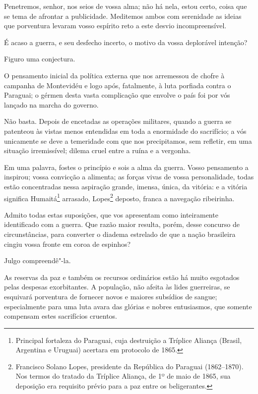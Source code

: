 \begin{linenumbers}

Penetremos, senhor, nos seios de vossa alma; não há nela, estou certo,
coisa que se tema de afrontar a publicidade. Meditemos ambos com		
serenidade as ideias que porventura levaram vosso espírito reto a este
desvio incompreensível. 

É acaso a guerra, e seu desfecho incerto, o motivo da vossa deplorável
intenção? 

Figuro uma conjectura. 

O pensamento inicial da política externa que nos arremessou de chofre à
campanha de Montevidéu e logo após, fatalmente, à luta porfiada contra
o Paraguai; o gérmen desta vasta complicação que envolve o país foi
por vós lançado na marcha do governo. 

Não basta. Depois de encetadas as operações militares, quando a guerra
se patenteou às vistas menos entendidas em toda a enormidade do
sacrifício; a vós unicamente se deve a temeridade com que nos
precipitamos, sem refletir, em uma situação irremissível; dilema cruel
entre a ruína e a vergonha. 

Em uma palavra, fostes o princípio e sois a alma da guerra. Vosso
pensamento a inspirou; vossa convicção a alimenta; as forças vivas de
vossa personalidade, todas estão concentradas nessa aspiração grande,
imensa, única, da vitória: e a vitória significa
Humaitá\footnote{ Principal fortaleza do Paraguai, cuja destruição a Tríplice Aliança
(Brasil, Argentina e Uruguai) acertara em protocolo de 1865.}
 arrasado, Lopes\footnote{ Francisco Solano Lopes, presidente da República do Paraguai
(1862--1870). Nos termos do tratado da Tríplice Aliança, de 1º de maio
de 1865, sua deposição era requisito prévio para a paz entre os
beligerantes.} deposto, franca a navegação ribeirinha. 

Admito todas estas suposições, que vos apresentam como inteiramente
identificado com a guerra. Que razão maior resulta, porém, desse
concurso de circunstâncias, para converter o diadema estrelado de que a
nação brasileira cingiu vossa fronte em coroa de espinhos? 

Julgo compreendê"-la.

As reservas da paz e também os recursos ordinários estão há muito
esgotados pelas despesas exorbitantes. A população, não afeita às lides
guerreiras, se esquivará porventura de fornecer novos e maiores
subsídios de sangue; especialmente para uma luta avara das glórias e
nobres entusiasmos, que somente compensam estes sacrifícios cruentos. 


\end{linenumbers}
